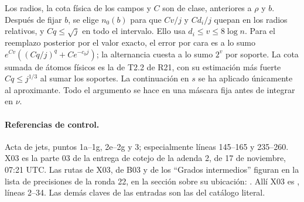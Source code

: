 Los radios, la cota física de los campos y $C$ son de clase, anteriores a $\rho$ y $b$.
Después de fijar $b$, se elige $n_0(b)$ para que $Cv/j$ y $Cd_i/j$ quepan en los
radios relativos, y $Cq\le\sqrt j$ en todo el intervalo. Ello usa $d_i\le v\le8\log n$.
Para el reemplazo posterior por el valor exacto, el error por cara es a lo sumo
$e^{Cv}((Cq/j)^q+Ce^{-c_0j})$; la alternancia cuesta a lo sumo $2^v$ por soporte.
La cota sumada de átomos físicos es la de T2.2 de R21, con su estimación más fuerte
$Cq\le j^{1/3}$ al sumar los soportes. La continuación en $s$ se ha aplicado únicamente
al aproximante. Todo el argumento se hace en una máscara fija antes de integrar en $\nu$.

\paragraph{Referencias de control.}
Acta de jets, puntos 1a--1g, 2e--2g y 3; especialmente líneas 145--165 y 235--260.
X03 es la parte 03 de la entrega de cotejo de la adenda 2, de 17 de noviembre, 07:21 UTC.
Las rutas de X03, de B03 y de los ``Grados intermedios'' figuran en la lista de precisiones
de la ronda 22, en la sección sobre su ubicación:
\allowbreak{}%
. Allí X03 es
, líneas 2--34.
Las demás claves de las entradas son las del catálogo literal.
